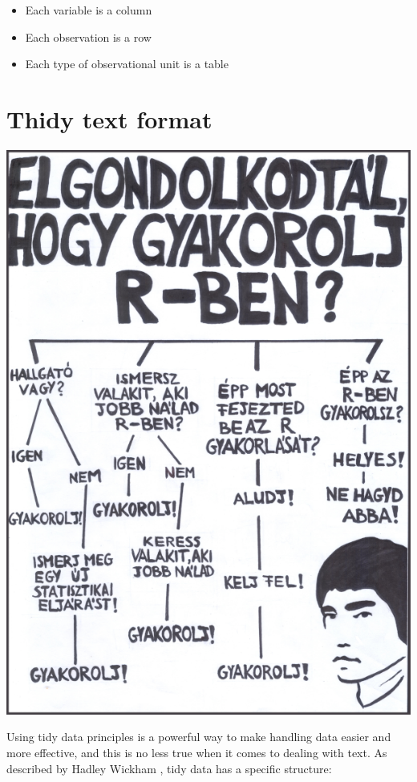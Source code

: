 \documentclass[
]{book}
\providecommand{\tightlist}{%
  \setlength{\itemsep}{0pt}\setlength{\parskip}{0pt}}
\begin{document}
\begin{itemize}
\tightlist
\item
  Each variable is a column
\item
  Each observation is a row
\item
  Each type of observational unit is a table
\end{itemize}

\hypertarget{tidynnddddtqqqext}{%
\chapter{Thidy text format}\label{tidynnddddtqqqext}}

\begin{center}\includegraphics[width=0.9\linewidth]{images/ch_04_small} \end{center}

Using tidy data principles is a powerful way to make handling data easier and more effective, and this is no less true when it comes to dealing with text. As described by Hadley Wickham \citep{tidydata}, tidy data has a specific structure:
\end{document}
